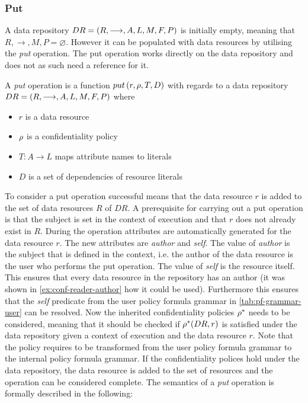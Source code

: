 \subsubsection{Put}\label{sec:put}
A data repository $DR= \left( R, \longrightarrow, A, L, M, F, P \right)$ is initially empty, meaning that $R, \longrightarrow, M, P = \varnothing$. However it can be populated with data resources by utilising the \emph{put} operation. The put operation works directly on the data repository and does not as such need a reference for it.
\begin{definition}
A \emph{put} operation is a function $put \left( r, \rho, T, D \right)$ with regards to a data repository $DR= \left( R, \longrightarrow, A, L, M, F, P \right)$ where
\begin{itemize}
  \item $r$ is a data resource
  \item $\rho$ is a confidentiality policy
  \item $T : A \rightarrow L$ maps attribute names to literals
  \item $D$ is a set of dependencies of resource literals
\end{itemize}
\end{definition}
To consider a put operation successful means that the data resource $r$ is added to the set of data resources $R$ of $DR$. A prerequisite for carrying out a put operation is that the subject is set in the context of execution and that $r$ does not already exist in $R$. During the operation attributes are automatically generated for the data resource $r$. The new attributes are \emph{author} and \emph{self}. The value of \emph{author} is the subject that is defined in the context, i.e. the author of the data resource is the user who performs the put operation. The value of \emph{self} is the resource itself. This ensures that every data resource in the repository has an author (it was shown in \autoref{ex:conf-reader-author} how it could be used). Furthermore this ensures that the \emph{self} predicate from the user policy formula grammar in \autoref{tab:pf-grammar-user} can be resolved. Now the inherited confidentiality policies $\rho^{\ast}$ needs to be considered, meaning that it should be checked if $\rho^{\ast}(DR,r)$ is satisfied under the data repository given a context of execution and the data resource $r$. Note that the policy requires to be transformed from the user policy formula grammar to the internal policy formula grammar. If the confidentiality polices hold under the data repository, the data resource is added to the set of resources and the operation can be considered complete.
The semantics of a \emph{put} operation is formally described in the following:
